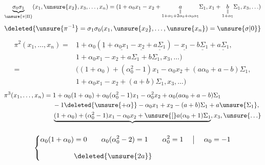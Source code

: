\[
\underbrace{\sigma_0\sigma_1}_{\unsure{\pi|\Pi}}(x_1,\unsure{x_2},x_3,\ldots,x_n)
=(1+\alpha_0x_1-x_2+\underset{\substack{\Vert\\1+\alpha_1+2\alpha_0+\alpha_0\alpha_1}}{a}\Sigma_1,
x_1+\underset{\substack{\Vert\\1+\alpha_1}}{b}\Sigma_1,x_3,\ldots)
\]
\[
\deleted{\unsure{\pi^{-1}}=\sigma_1\sigma_0(x_1,\unsure{x_2},\ldots,\unsure{x_n})=\unsure{\sigma|0}}
\]
\[
\begin{aligned}
\pi^2(x_1,\ldots,x_n)={}&\underline{1}+\alpha_0(\underline{1}+\underline{\alpha_0x_1}-\underline{x_2}+\underline{a\Sigma_1})-\underline{x_1}-\underline{b\Sigma_1}+\underline{a\Sigma_1},\\
&1+\alpha_0x_1-x_2+a\Sigma_1+b\Sigma_1,x_3,\ldots)\\
={}&((1+\alpha_0)+(\alpha_0^2-1)x_1-\alpha_0x_2+(a\alpha_0+a-b)\Sigma_1,\\
&1+\alpha_0x_1-x_2+(a+b)\Sigma_1,x_3,\ldots)
\end{aligned}
\]
\[
\begin{aligned}
\pi^3(x_1,\ldots,x_n)={}&1+\alpha_0(1+\alpha_0)+\alpha_0(\alpha_0^2-1)x_1-\alpha_0^2x_2+\alpha_0(a\alpha_0+a-b)\Sigma_1\\
&-1\deleted{\unsure{+\alpha}}-\alpha_0x_1+x_2-(a+b)\Sigma_1+a\unsure{\Sigma_1},\\
&\underbrace{(1+\alpha_0)+(\alpha_0^2-1)x_1-\alpha_0x_2+\unsure{[}a(\alpha_0+1)\Sigma_1}_{\phantom{(1+\alpha_0)+(\alpha_0^2-1)x_1}} ,x_3,\unsure{\ldots}
\end{aligned}
\]
\[
\left\{\begin{aligned}
\alpha_0(1+\alpha_0)&=0\qquad\alpha_0(\alpha_0^2-2)=1\qquad\alpha_0^2=1\quad\bigm|\quad\alpha_0=-1\\[2ex]
&\deleted{\unsure{2a}}
\end{aligned}\right.
\]

